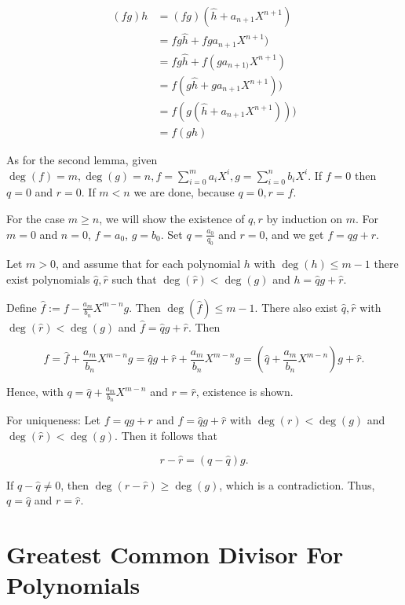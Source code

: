 \begin{align*}
    (fg)h &= (fg)(\hat{h} + a_{n + 1}X^{n + 1}) \\  
          &= fg\hat{h} + fga_{n + 1}X^{n + 1}) \\ 
          &= fg\hat{h} + f(ga_{n + 1)}X^{n + 1}) \\ 
          &= f(g\hat{h} + ga_{n + 1}X^{n + 1})) \\ 
          &= f(g(\hat{h} + a_{n + 1}X^{n + 1}))) \\ 
          &= f(gh)
\end{align*}

\QED 

As for the second lemma, given \(\deg(f) = m, \deg(g) = n, f = \sum_{i = 0}^{m} a_i X^i, g = \sum_{i = 0}^{n} b_i X^i\).
If \(f = 0\) then \(q = 0\) and \(r = 0\). If \(m < n\) we are done, because \(q = 0, r = f\). 

For the case \(m \ge n\), we will show the existence of \(q,r\) by induction on \(m\). For 
\(m = 0\) and \(n = 0\), \(f = a_0\), \(g = b_0\). Set \(q = \frac{a_0}{q_0}\) and \(r = 0\), and we get 
\(f = qg + r\).

Let \(m > 0\), and assume that for each polynomial \(h\) with \(\deg(h) \le m - 1\) there 
exist polynomials \(\hat{q}, \hat{r}\) such that \(\deg(\hat{r}) < \deg(g)\) and 
\(h = \hat{q}g + \hat{r}\).

Define \(\hat{f} := f - \frac{a_m}{b_n}X^{m - n}g\). Then \(\deg(\hat{f}) \le m - 1\). There also 
exist \(\hat{q}, \hat{r}\) with \(\deg(\hat{r}) < \deg(g)\) and \(\hat{f} = \hat{q}g + \hat{r}\). Then 

\[
    f = \hat{f} + \frac{a_m}{b_n} X^{m-n} g
    = \hat{q} g + \hat{r} + \frac{a_m}{b_n} X^{m-n} g
    = \left(\hat{q} + \frac{a_m}{b_n} X^{m-n}\right) g + \hat{r}.
\]

Hence, with \(q = \hat q + \frac{a_m}{b_n} X^{m-n}\) and \(r = \hat{r}\), existence is shown.

For uniqueness: Let \(f = qg + r\) and \(f = \hat{q}g + \hat{r}\)
with \(\deg(r) < \deg(g)\) and \(\deg(\hat{r}) < \deg(g)\). Then it follows that

\[
    r - \hat{r} = (q - \hat{q}) g .
\]

If \(q - \hat{q} \neq 0\), then \(\deg(r - \hat{r}) \ge \deg(g)\),
which is a contradiction. Thus, \(q = \hat{q}\) and \(r = \hat{r}\).

\QED

\section{Greatest Common Divisor For Polynomials}

